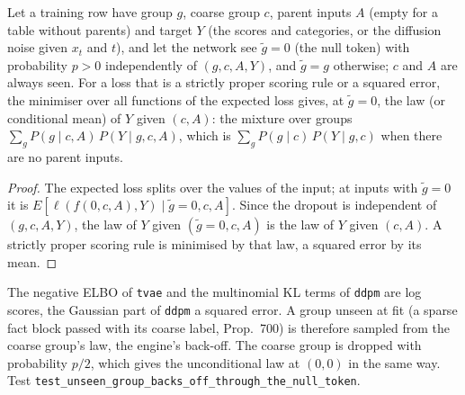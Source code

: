 \setcounter{proposition}{1800}
\begin{proposition}\label{prop:nnnull}
Let a training row have group $g$, coarse group $c$, parent inputs $A$ (empty for a table without parents) and target $Y$ (the scores and categories, or the diffusion noise given $x_t$ and $t$), and let the network see $\tilde g=0$ (the null token) with probability $p>0$ independently of $(g,c,A,Y)$, and $\tilde g=g$ otherwise; $c$ and $A$ are always seen. For a loss that is a strictly proper scoring rule or a squared error, the minimiser over all functions of the expected loss gives, at $\tilde g=0$, the law (or conditional mean) of $Y$ given $(c,A)$: the mixture over groups $\sum_g P(g\mid c,A)\,P(Y\mid g,c,A)$, which is $\sum_g P(g\mid c)\,P(Y\mid g,c)$ when there are no parent inputs.
\end{proposition}
\begin{proof}
The expected loss splits over the values of the input; at inputs with $\tilde g=0$ it is $E[\ell(f(0,c,A),Y)\mid\tilde g=0,c,A]$. Since the dropout is independent of $(g,c,A,Y)$, the law of $Y$ given $(\tilde g=0,c,A)$ is the law of $Y$ given $(c,A)$. A strictly proper scoring rule is minimised by that law, a squared error by its mean.
\end{proof}
\noindent The negative ELBO of \texttt{tvae} and the multinomial KL terms of \texttt{ddpm} are log scores, the Gaussian part of \texttt{ddpm} a squared error. A group unseen at fit (a sparse fact block passed with its coarse label, Prop.~700) is therefore sampled from the coarse group's law, the engine's back-off. The coarse group is dropped with probability $p/2$, which gives the unconditional law at $(0,0)$ in the same way. Test \texttt{test\_unseen\_group\_backs\_off\_through\_the\_null\_token}.

